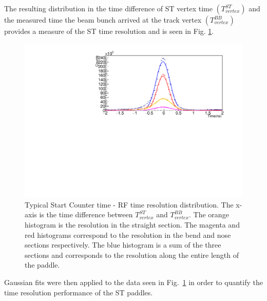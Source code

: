 The resulting distribution in the time difference of ST vertex time $(T^{ST}_{vertex})$ and the measured time the beam bunch arrived at the track vertex $(T^{BB}_{vertex})$ provides a measure of the ST time resolution and is seen in Fig. \ref{fig:st_time_res}.
	\begin{figure}[!htb]
		\centering
		\includegraphics[width=1.08\linewidth]{performance/figs/TR_15}
		\caption{Typical Start Counter time - RF time resolution distribution.  The x-axis is the time difference between $T^{ST}_{vertex}$ and $T^{BB}_{vertex}$. The orange histogram is the resolution in the straight section. The magenta and red histograms correspond to the resolution in the bend and nose sections respectively. The blue histogram is a sum of the three sections and corresponds to the resolution along the entire length of the paddle.}
		\label{fig:st_time_res}
	\end{figure}
Gaussian fits were then applied to the data seen in Fig.~\ref{fig:st_time_res} in order to quantify the time resolution performance of the ST paddles.



